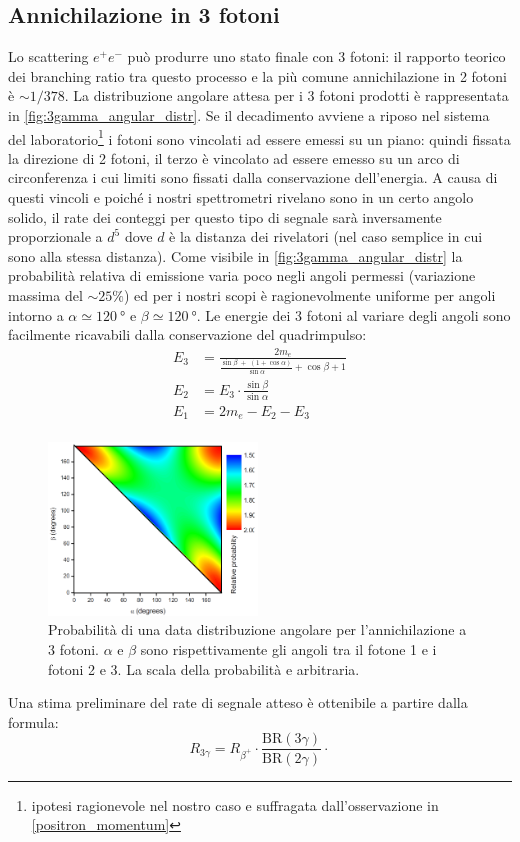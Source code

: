 \subsection{Annichilazione in 3 fotoni}

Lo scattering $e^+e^-$ può produrre uno stato finale con 3 fotoni: il rapporto teorico dei branching ratio tra questo processo e la più comune annichilazione in 2 fotoni è $\sim 1/378$\cite{3gamma}. La distribuzione angolare attesa per i 3 fotoni prodotti è rappresentata in \autoref{fig:3gamma_angular_distr}. Se il decadimento avviene a riposo nel sistema del laboratorio\footnote{ipotesi ragionevole nel nostro caso e suffragata dall'osservazione in \autoref{positron_momentum}} i fotoni sono vincolati ad essere emessi su un piano: quindi fissata la direzione di 2 fotoni, il terzo è vincolato ad essere emesso su un arco di circonferenza i cui limiti sono fissati dalla conservazione dell'energia. A causa di questi vincoli e poiché i nostri spettrometri rivelano sono in un certo angolo solido, il rate dei conteggi per questo tipo di segnale sarà inversamente proporzionale a $d^5$ dove $d$ è la distanza dei rivelatori (nel caso semplice in cui sono alla stessa distanza).
Come visibile in \autoref{fig:3gamma_angular_distr} la probabilità relativa di emissione varia poco negli angoli permessi (variazione massima del $\sim 25\%$) ed per i nostri scopi è ragionevolmente uniforme per angoli intorno a $\alpha\simeq \SI{120}{\degree}$ e $\beta\simeq\SI{120}{\degree}$.
Le energie dei 3 fotoni al variare degli angoli sono facilmente ricavabili dalla conservazione del quadrimpulso:
\begin{align*}
\label{eq:3gamma_energy}
E_3 &= \frac{2 m_e}{\frac{\sin\beta \;+\;(1+\cos\alpha)}{\sin\alpha}+\cos\beta+1}\\
E_2 &= E_3 \cdot \frac{\sin\beta}{\sin\alpha}\\
E_1 &= 2m_e - E_2 - E_3\\
\end{align*}

 \begin{figure}[h]
	\centering
	\includegraphics[width=15em]{immagini/3gamma_distribution}
	\caption{\label{fig:3gamma_angular_distr}Probabilità di una data distribuzione angolare per l'annichilazione a 3 fotoni. $\alpha$ e $\beta$ sono rispettivamente gli angoli tra il fotone 1 e i fotoni 2 e 3. La scala della probabilità e arbitraria.}
\end{figure}

Una stima preliminare del rate di segnale atteso è ottenibile a partire dalla formula:
\begin{equation}
\label{eq:stima_3gamma}
R_{3\gamma} = R_{\beta^+} \cdot \frac{\text{BR}(3\gamma)}{\text{BR}(2\gamma)} \cdot 
\end{equation}




